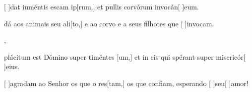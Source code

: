 {  {\item {}[ ]{dat} iuméntis escam ip[rum,] et pullis corvórum invocán[ ]{e}um.~\Antiphona}%
    {\item {} dá aos animais seu ali[to,] e ao corvo e a seus filhotes que [ ]{in}{vo}cam.~\Antiphona},
  {\item {}plácitum est Dómino super timéntes [um,] et in eis qui spérant super misericór[ ]{e}ius.~\Antiphona}%
    {\item {}[ ]{a}gradam ao Senhor os que o res[tam,] os que confiam, esperando [ ]{seu}[ ]{a}mor!~\Antiphona}
}